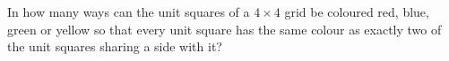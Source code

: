 In how many ways can the unit squares of a $4\times4$ grid be coloured red, blue, green or yellow so that every unit square has the same colour as exactly two of the unit squares sharing a side with it?
